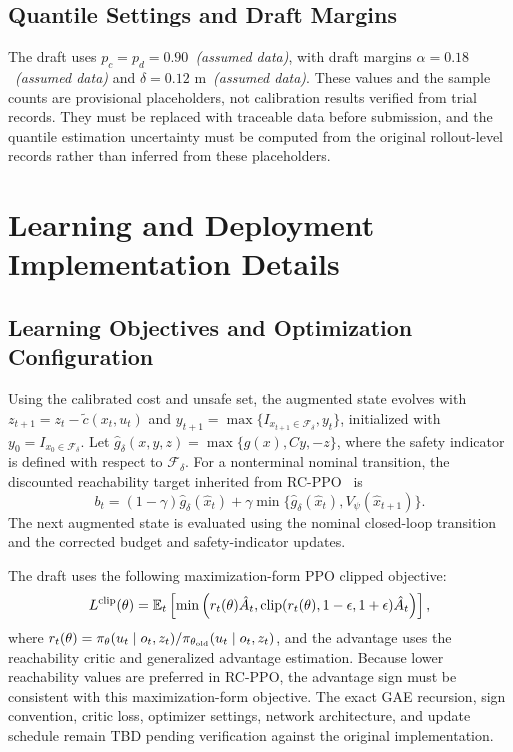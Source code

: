 \documentclass{article}
\begin{document}
\subsection{Quantile Settings and Draft Margins}
The draft uses $p_c=p_d=0.90$~\textit{(assumed data)}, with draft margins
$\alpha=0.18$~\textit{(assumed data)} and $\delta=0.12$ m~\textit{(assumed data)}.
These values and the sample counts are provisional placeholders, not calibration
results verified from trial records. They must be replaced with traceable data
before submission, and the quantile estimation uncertainty must be computed from
the original rollout-level records rather than inferred from these placeholders.

\section{Learning and Deployment Implementation Details}
\label{app:learning_details}
\subsection{Learning Objectives and Optimization Configuration}
Using the calibrated cost and unsafe set, the augmented state evolves with
$z_{t+1}=z_t-\tilde c(x_t,u_t)$ and
$y_{t+1}=\max\{I_{x_{t+1}\in\mathcal{F}_\delta},y_t\}$, initialized with
$y_0=I_{x_0\in\mathcal{F}_\delta}$. Let
$\hat g_\delta(x,y,z)=\max\{g(x),Cy,-z\}$, where the safety indicator is defined
with respect to $\mathcal{F}_\delta$. For a nonterminal nominal transition,
the discounted reachability target inherited from RC-PPO~\citep{so2024} is
\begin{equation}
b_t=(1-\gamma)\hat g_\delta(\hat x_t)+\gamma\min\{
\hat g_\delta(\hat x_t),V_\psi(\hat x_{t+1})\}.
\end{equation}
The next augmented state is evaluated using the nominal closed-loop transition and
the corrected budget and safety-indicator updates.

The draft uses the following maximization-form PPO clipped objective:
\begin{equation}
L^{\rm clip}(\theta)=\mathbb{E}_t\left[\min\left(r_t(\theta)\hat A_t,
\operatorname{clip}(r_t(\theta),1-\epsilon,1+\epsilon)\hat A_t\right)\right],
\end{equation}
where $r_t(\theta)=\pi_\theta(u_t\mid o_t,z_t)/
\pi_{\theta_{\rm old}}(u_t\mid o_t,z_t)$, and the advantage uses the
reachability critic and generalized advantage estimation. Because lower
reachability values are preferred in RC-PPO, the advantage sign must be consistent
with this maximization-form objective. The exact GAE recursion, sign convention,
critic loss, optimizer settings, network architecture, and update schedule remain
\textsc{TBD} pending verification against the original implementation.
\end{document}
